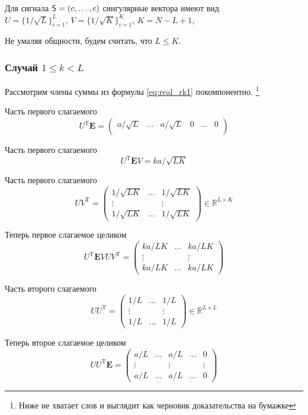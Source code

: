 \documentclass[specialist,
               substylefile = spbu.rtx,
               subf,href,colorlinks=true, 12pt]{disser}
\begin{document}
Для сигнала $\textsf{S} = (c, \ldots, c)$ сингулярные вектора имеют вид
$U = \{1/\sqrt{L}\}^{L}_{i = 1},\, V = \{1/\sqrt{K}\}^{K}_{i = 1}$, $K = N - L + 1$,

Не умаляя общности, будем считать, что $L \leq K$.

\subsubsection{Случай $1 \leq k < L$}

Рассмотрим члены суммы из формулы \eqref{eq:real_rk1} покомпонентно.
\footnote{Ниже не хватает слов и выглядит как черновик доказательства на бумажке}

Часть первого слагаемого
$$U^{\mathrm{T}} \mathbf{E} = \begin{pmatrix}
	 a/\sqrt{L} & \ldots & a/\sqrt{L} & 0 & \ldots & 0\\
\end{pmatrix}$$

Часть первого слагаемого
$$U^{\mathrm{T}} \mathbf{E} V = k a / \sqrt{LK}$$

Часть первого слагаемого
$$U V^{\mathrm{T}} = \begin{pmatrix}
	1/\sqrt{LK} & \ldots & 1/\sqrt{LK}\\
	\vdots & & \vdots\\
	1/\sqrt{LK} &   \ldots &  1/\sqrt{LK}
\end{pmatrix}\in \mathbb{R}^{L \times K}
$$

Теперь первое слагаемое целиком
$$U^{\mathrm{T}} \mathbf{E} V U V^{\mathrm{T}} = \begin{pmatrix}
	k a/ LK & \ldots &  k a/ LK\\
	\vdots & & \vdots\\
	k a/ LK &   \ldots &  k a/ LK
\end{pmatrix}$$

Часть второго слагаемого
$$U U^{\mathrm{T}} = \begin{pmatrix}
	1/L & \ldots & 1/L\\
	
	\vdots & & \vdots\\
	1/L &   \ldots &  1/L
\end{pmatrix}\in \mathbb{R}^{L \times L}$$

Теперь второе слагаемое целиком
$$U U^{\mathrm{T}} \mathbf{E} = \begin{pmatrix}
	a/L & \ldots & a/L & \ldots & 0\\
	\vdots & & \vdots & & \vdots\\
	a/L & \ldots & a/L & \ldots & 0
\end{pmatrix}$$
\end{document}
